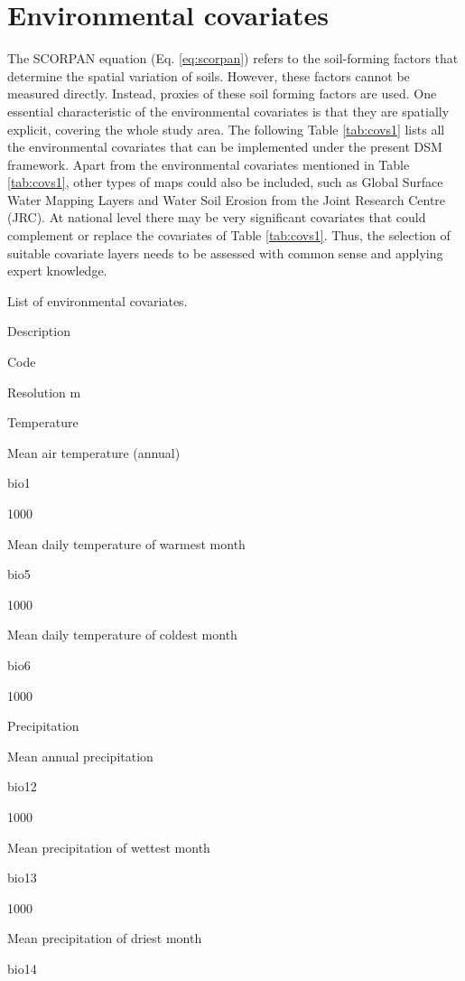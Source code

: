 \documentclass[
  10pt,
  b5paper,
  oneside]{book}
\begin{document}
\hypertarget{environmental-covariates-1}{%
\section{Environmental covariates}\label{environmental-covariates-1}}

The SCORPAN equation (Eq. \eqref{eq:scorpan}) refers to the soil-forming factors that determine the spatial variation of soils. However, these factors cannot be measured directly. Instead, proxies of these soil forming factors are used. One essential characteristic of the environmental covariates is that they are spatially explicit, covering the whole study area. The following Table \ref{tab:covs1} lists all the environmental covariates that can be implemented under the present DSM framework. Apart from the environmental covariates mentioned in Table \ref{tab:covs1}, other types of maps could also be included, such as Global Surface Water Mapping Layers and Water Soil Erosion from the Joint Research Centre (JRC). At national level there may be very significant covariates that could complement or replace the covariates of Table \ref{tab:covs1}. Thus, the selection of suitable covariate layers needs to be assessed with common sense and applying expert knowledge.

\label{tab:covs1}List of environmental covariates.

Description

Code

Resolution m

Temperature

Mean air temperature (annual)

bio1

1000

Mean daily temperature of warmest month

bio5

1000

Mean daily temperature of coldest month

bio6

1000

Precipitation

Mean annual precipitation

bio12

1000

Mean precipitation of wettest month

bio13

1000

Mean precipitation of driest month

bio14
\end{document}
